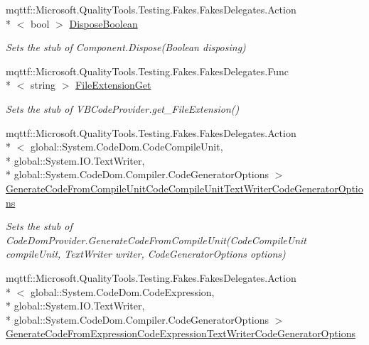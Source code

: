 \begin{DoxyCompactItemize}
mqttf\-::\-Microsoft.\-Quality\-Tools.\-Testing.\-Fakes.\-Fakes\-Delegates.\-Action\\*
$<$ bool $>$ \hyperlink{class_microsoft_1_1_visual_basic_1_1_fakes_1_1_stub_v_b_code_provider_ab98298661bb4094b7f0c9af52a1408af}{Dispose\-Boolean}
\begin{DoxyCompactList}\small\item\em Sets the stub of Component.\-Dispose(\-Boolean disposing)\end{DoxyCompactList}\item 
mqttf\-::\-Microsoft.\-Quality\-Tools.\-Testing.\-Fakes.\-Fakes\-Delegates.\-Func\\*
$<$ string $>$ \hyperlink{class_microsoft_1_1_visual_basic_1_1_fakes_1_1_stub_v_b_code_provider_ad8f14bccabcdfc9286be74f125b67ed3}{File\-Extension\-Get}
\begin{DoxyCompactList}\small\item\em Sets the stub of V\-B\-Code\-Provider.\-get\-\_\-\-File\-Extension()\end{DoxyCompactList}\item 
mqttf\-::\-Microsoft.\-Quality\-Tools.\-Testing.\-Fakes.\-Fakes\-Delegates.\-Action\\*
$<$ global\-::\-System.\-Code\-Dom.\-Code\-Compile\-Unit, \\*
global\-::\-System.\-I\-O.\-Text\-Writer, \\*
global\-::\-System.\-Code\-Dom.\-Compiler.\-Code\-Generator\-Options $>$ \hyperlink{class_microsoft_1_1_visual_basic_1_1_fakes_1_1_stub_v_b_code_provider_a267fb94e2d5305e26ca47645126539aa}{Generate\-Code\-From\-Compile\-Unit\-Code\-Compile\-Unit\-Text\-Writer\-Code\-Generator\-Options}
\begin{DoxyCompactList}\small\item\em Sets the stub of Code\-Dom\-Provider.\-Generate\-Code\-From\-Compile\-Unit(\-Code\-Compile\-Unit compile\-Unit, Text\-Writer writer, Code\-Generator\-Options options)\end{DoxyCompactList}\item 
mqttf\-::\-Microsoft.\-Quality\-Tools.\-Testing.\-Fakes.\-Fakes\-Delegates.\-Action\\*
$<$ global\-::\-System.\-Code\-Dom.\-Code\-Expression, \\*
global\-::\-System.\-I\-O.\-Text\-Writer, \\*
global\-::\-System.\-Code\-Dom.\-Compiler.\-Code\-Generator\-Options $>$ \hyperlink{class_microsoft_1_1_visual_basic_1_1_fakes_1_1_stub_v_b_code_provider_a235365e51c55d47e4d630be64460b9f9}{Generate\-Code\-From\-Expression\-Code\-Expression\-Text\-Writer\-Code\-Generator\-Options}

\end{DoxyCompactItemize}
